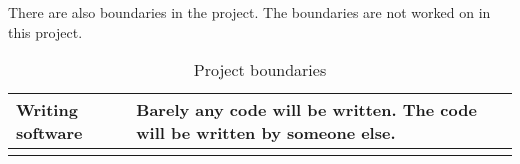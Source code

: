 There are also boundaries in the project. The boundaries are not worked on in this project.

\begin{table}[H]
    \centering
    \begin{tabular}{p{8cm} | p{8cm}}
        \bf Writing software & Barely any code will be written. The code will be written by someone else.\\\hline
        \bf  & \\
    \end{tabular}
    \caption{Project boundaries}
    \label{tab:projectgrenzen}
\end{table}